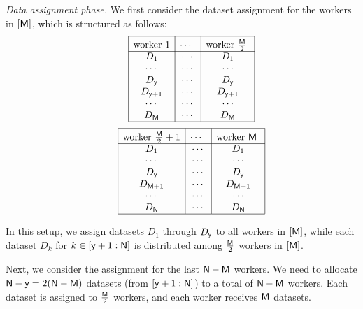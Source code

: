 \documentclass[conference,letterpaper]{IEEEtran}
\begin{document}
{\it Data assignment phase.}
We first consider the dataset assignment for the workers in $[{\sf M}]$, which is structured as follows:
\begin{align*}
\begin{array}{rl|c|c|c|}\cline{3-3}\cline{4-4}\cline{5-5}
&&\rule{0pt}{1.2em}\mbox{worker 1} &\rule{0pt}{1.2em}\mbox{$\cdots$ } &  \rule{0pt}{1.2em}\mbox{worker $\frac{\Msf}{2}$ }\\ 
\cline{3-3}\cline{4-4}\cline{5-5}
&& D_1 & \cdots & D_1  \\
&& \cdots & \cdots & \cdots  \\ 
&& D_{\ysf} & \cdots & D_{\ysf}  \\
&& D_{\ysf+1} & \cdots & D_{\ysf+1}  \\ 
&& \cdots & \cdots & \cdots  \\
&& D_{\Msf} & \cdots & D_{\Msf}\\  
\cline{3-3}\cline{4-4}\cline{5-5}
\end{array}
\end{align*}
\begin{align*}
\begin{array}{rl|c|c|c|}\cline{3-3}\cline{4-4}\cline{5-5}
&& \rule{0pt}{1.2em}\mbox{worker $\frac{\Msf}{2}  +1$}&  \rule{0pt}{1.2em}\mbox{$\cdots$ } &  \rule{0pt}{1.2em}\mbox{worker $\Msf$ } \\ 
\cline{3-3}\cline{4-4}\cline{5-5}
&& D_1 & \cdots & D_1 \\
&& \cdots & \cdots & \cdots \\ 
&& D_{\ysf} & \cdots & D_{\ysf} \\
&& D_{\Msf+1} & \cdots & D_{\Msf+1} \\ 
&& \cdots & \cdots & \cdots \\
&&  D_{\Nsf} & \cdots & D_{\Nsf} \\  
\cline{3-3}\cline{4-4}\cline{5-5}
\end{array}
\end{align*}

In this setup, we assign datasets $D_1$ through $D_{{\sf y}}$ to all workers in $[{\sf M}]$, while each dataset $D_k$ for $k \in [{\sf y}+1 : {\sf N}]$ is distributed among $\frac{{\sf M}}{2}$ workers in $[{\sf M}]$.

Next, we consider the assignment for the last ${\sf N}-{\sf M}$ workers.
We need to allocate ${\sf N}-{\sf y} = 2({\sf N}-{\sf M})$ datasets (from $[{\sf y}+1 : {\sf N}]$) to a total of ${\sf N}-{\sf M}$ workers. Each dataset is assigned to $\frac{{\sf M}}{2}$ workers, and each worker receives ${\sf M}$ datasets. 
\end{document}
